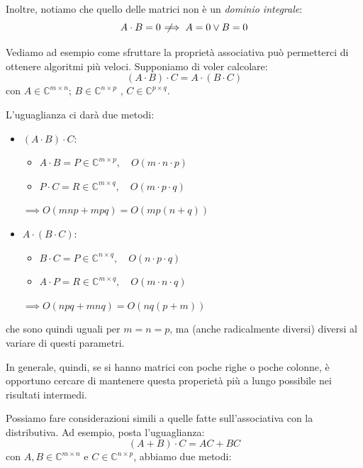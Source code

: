 \documentclass[a4paper,11pt]{article}
\begin{document}
Inoltre, notiamo che quello delle matrici non è un \textit{dominio integrale}: 
$$
A \cdot B = 0 \;\not\!\!\!\implies A = 0 \vee B = 0
$$

Vediamo ad esempio come sfruttare la proprietà associativa può permetterci di ottenere algoritmi più veloci.
Supponiamo di voler calcolare:
$$
(A \cdot B) \cdot C = A \cdot (B\cdot C)
$$
con $A \in \mathbb{C}^{m \times n}$; $B \in \mathbb{C}^{n \times p}$ , $C \in \mathbb{C}^{p \times q}$.

L'uguaglianza ci darà due metodi:
\begin{itemize}
	\item $(A \cdot B) \cdot C$:
		\begin{itemize}
			\item $A \cdot B = P \in \mathbb{C}^{m \times p}, \quad O(m \cdot n \cdot p)$
			\item $P \cdot C = R \in \mathbb{C}^{m \times q}, \quad O(m \cdot p \cdot q)$
		\end{itemize}
		$\implies O(mnp + mpq) = O\left( mp (n + q) \right)$
	\item $A \cdot (B\cdot C)$:
		\begin{itemize}
			\item $B \cdot C = P \in \mathbb{C}^{n \times q}, \quad O(n \cdot p \cdot q)$
			\item $A \cdot P = R \in \mathbb{C}^{m \times q}, \quad O(m \cdot n \cdot q)$
		\end{itemize}
		$\implies O(npq + mnq) = O\left( nq (p + m) \right)$
\end{itemize}
che sono quindi uguali per $m = n = p$, ma (anche radicalmente diversi) diversi al variare di questi parametri.

In generale, quindi, se si hanno matrici con poche righe o poche colonne, è opportuno cercare di mantenere questa properietà più a lungo possibile nei risultati intermedi.

\par\smallskip

Possiamo fare considerazioni simili a quelle fatte sull'associativa con la distributiva.
Ad esempio, posta l'uguaglianza:
$$
(A + B) \cdot C = AC + BC
$$
con $A, B \in \mathbb{C}^{m \times n}$ e $C \in \mathbb{C}^{n \times p}$, abbiamo due metodi:
\end{document}
